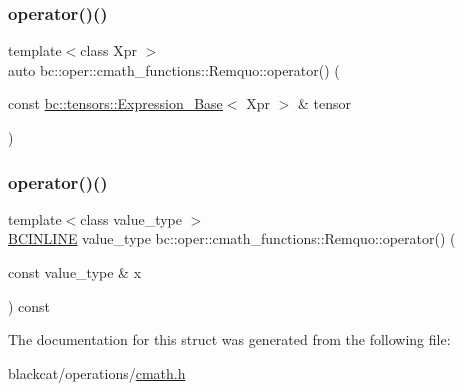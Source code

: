 \mbox{\label{structbc_1_1oper_1_1cmath__functions_1_1Remquo_a5e851d9c26d2c5bcf525e77dd626537b}} 
\subsubsection{\texorpdfstring{operator()()}{operator()()}\hspace{0.1cm}{\footnotesize\ttfamily [2/3]}}
{\footnotesize\ttfamily template$<$class Xpr $>$ \\
auto bc\+::oper\+::cmath\+\_\+functions\+::\+Remquo\+::operator() (\begin{DoxyParamCaption}\item[{const \hyperlink{classbc_1_1tensors_1_1Expression__Base}{bc\+::tensors\+::\+Expression\+\_\+\+Base}$<$ Xpr $>$ \&}]{tensor }\end{DoxyParamCaption})\hspace{0.3cm}{\ttfamily [inline]}}

\mbox{\label{structbc_1_1oper_1_1cmath__functions_1_1Remquo_a839e6c3319227cd9a2ac070f6355d82f}} 
\subsubsection{\texorpdfstring{operator()()}{operator()()}\hspace{0.1cm}{\footnotesize\ttfamily [3/3]}}
{\footnotesize\ttfamily template$<$class value\+\_\+type $>$ \\
\hyperlink{common_8h_a6699e8b0449da5c0fafb878e59c1d4b1}{B\+C\+I\+N\+L\+I\+NE} value\+\_\+type bc\+::oper\+::cmath\+\_\+functions\+::\+Remquo\+::operator() (\begin{DoxyParamCaption}\item[{const value\+\_\+type \&}]{x }\end{DoxyParamCaption}) const\hspace{0.3cm}{\ttfamily [inline]}}



The documentation for this struct was generated from the following file\+:\begin{DoxyCompactItemize}
\item 
blackcat/operations/\hyperlink{cmath_8h}{cmath.\+h}\end{DoxyCompactItemize}
